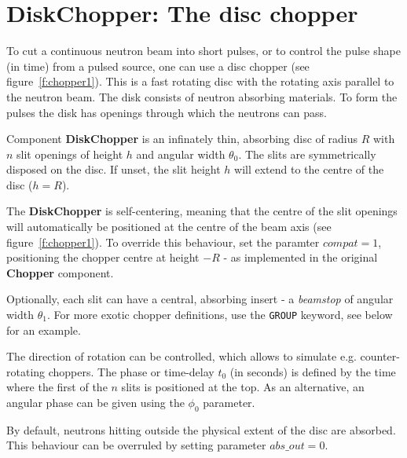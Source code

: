 
\section{DiskChopper: The disc chopper}
\label{s:chopper}


To cut a continuous neutron beam into short pulses, or to control
the pulse shape (in time) from a pulsed source, one can use a disc
chopper (see figure~\ref{f:chopper1}). This is a fast rotating disc with the
rotating axis parallel to the neutron beam. The disk consists of neutron
absorbing materials. To form the pulses the disk has openings through which
the neutrons can pass.

Component {\bf DiskChopper} is an infinately thin, absorbing disc of
radius $R$ with $n$ slit openings of height $h$ and angular width
$\theta_0$. The slits are symmetrically disposed on the disc. If
unset, the slit height $h$ will extend to the centre of the disc ($h=R$).

The {\bf DiskChopper} is self-centering, meaning that the centre of
the slit openings will automatically be positioned at the centre of
the beam axis (see figure~\ref{f:chopper1}). To override this behaviour, set the paramter
$compat=1$, positioning the chopper centre at height $-R$ - as
implemented in the original {\bf Chopper} component.

Optionally, each slit can have a central, absorbing insert - a
\emph{beamstop} of angular width $\theta_1$. For more exotic chopper
definitions, use the \texttt{GROUP} keyword, see below for an example.

The direction of rotation can be controlled,
which allows to simulate e.g. counter-rotating choppers.
The phase or time-delay $t_0$ (in seconds) is defined by the time
where the first of the $n$ slits is positioned at the top. As an
alternative, an angular phase can be given using the $\phi_0$ parameter.

By default, neutrons hitting outside the physical extent of the disc
are absorbed. This behaviour can be overruled by setting parameter
$abs\_out=0$.


